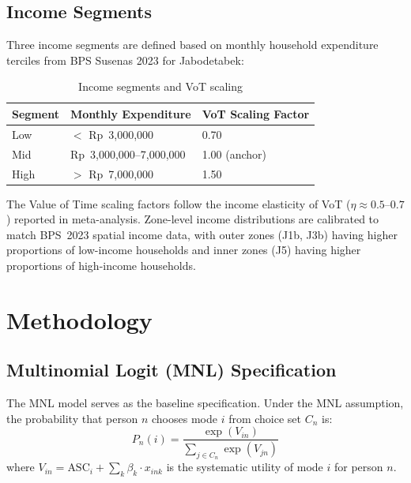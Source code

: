 \documentclass[12pt,a4paper]{article}
\begin{document}
\subsection{Income Segments}

Three income segments are defined based on monthly household expenditure terciles from BPS Susenas 2023 for Jabodetabek:

\begin{table}[ht]
\centering
\caption{Income segments and VoT scaling}
\label{tab:income}
\begin{tabular}{lll}
\toprule
Segment & Monthly Expenditure & VoT Scaling Factor \\
\midrule
Low   & $<$ Rp~3,000,000            & 0.70 \\
Mid   & Rp~3,000,000--7,000,000     & 1.00 (anchor) \\
High  & $>$ Rp~7,000,000            & 1.50 \\
\bottomrule
\end{tabular}
\end{table}

The Value of Time scaling factors follow the income elasticity of VoT ($\eta \approx 0.5$--$0.7$) reported in \citet{binsuwadan2023} meta-analysis. Zone-level income distributions are calibrated to match BPS~2023 spatial income data, with outer zones (J1b, J3b) having higher proportions of low-income households and inner zones (J5) having higher proportions of high-income households.

\section{Methodology}

\subsection{Multinomial Logit (MNL) Specification}

The MNL model serves as the baseline specification. Under the MNL assumption, the probability that person $n$ chooses mode $i$ from choice set $C_n$ is:
\begin{equation}
P_n(i) = \frac{\exp(V_{in})}{\sum_{j \in C_n} \exp(V_{jn})}
\label{eq:mnlprob}
\end{equation}
where $V_{in} = \text{ASC}_i + \sum_k \beta_k \cdot x_{ink}$ is the systematic utility of mode $i$ for person $n$.
\end{document}

